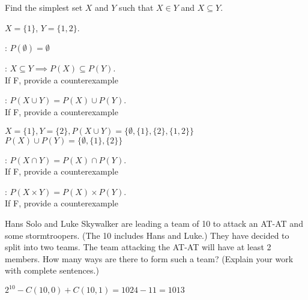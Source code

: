 \nextq
Find the simplest set $X$ and $Y$ such that $X \in Y$
and $X \subseteq Y$.
\begin{answerlong}
$X = \{ 1 \}$, $Y = \{ 1,2 \}$.
\end{answerlong}

\nextq
\tf: $P(\emptyset) = \emptyset$
\dotfill{}

\nextq
\tf: $X \subseteq Y \implies P(X) \subseteq P(Y)$.
\dotfill{}
\\
If F, provide a counterexample
\begin{answerlong}

\end{answerlong}

\nextq
\tf: $P(X \cup Y) = P(X) \cup P(Y)$.
\dotfill{}
\\
If F, provide a counterexample
\begin{answerlong}
$X = \{1\}, Y = \{2\}, P(X \cup Y) = \{\emptyset, \{1\}, \{2\}, \{1,2\} \}$
$P(X) \cup P(Y) = \{\emptyset, \{1\}, \{2\}\}$
\end{answerlong}

\nextq
\tf: $P(X \cap Y) = P(X) \cap P(Y)$.
\dotfill{}
\\
If F, provide a counterexample
\begin{answerlong}

\end{answerlong}

\nextq
\tf: $P(X \times Y) = P(X) \times P(Y)$.
\dotfill{}
\\
If F, provide a counterexample
\begin{answerlong}

\end{answerlong}

\nextq
Hans Solo and Luke Skywalker are leading a team of 10 to attack
an AT-AT and some stormtroopers. (The 10 includes Hans and Luke.)
They have decided to split into two teams.
The team attacking the AT-AT will have at least 2 members.
How many ways are there to form such a team?
(Explain your work with complete sentences.)
\begin{answerlong}
$2^10- C(10,0) + C(10,1) = 1024 - 11 = 1013$
\end{answerlong}

